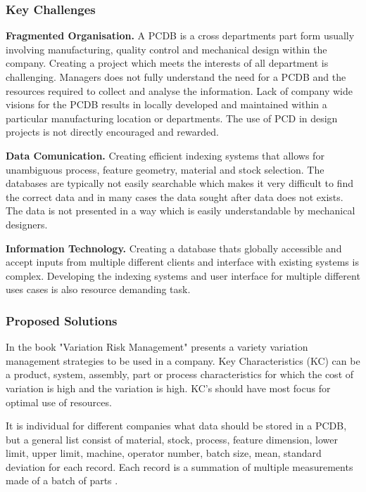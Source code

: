 \documentclass[aip,amsmath, reprint, author-year]{revtex4-1}
\begin{document}
\subsubsection{Key Challenges}
\textbf{Fragmented Organisation.}  A PCDB is a cross departments part form usually involving manufacturing, quality control and mechanical design within the company. 
Creating a project which meets the interests of all department is challenging. 
Managers does not fully understand the need for a PCDB and the resources required to collect and analyse the information. 
Lack of company wide visions for the PCDB results in locally developed and maintained within a particular manufacturing location or departments. 
The use of PCD in design projects is not directly encouraged and rewarded. 

\textbf{Data Comunication.} Creating efficient indexing systems that allows for unambiguous process, feature geometry, material and stock selection. 
The databases are typically not easily searchable which makes it very difficult to find the correct data and in many cases the data sought after data does not exists. 
The data is not presented in a way which is easily understandable by mechanical designers.

\textbf{Information Technology.} Creating a database thats globally accessible and accept inputs from multiple different clients and interface with existing systems is complex.
Developing the indexing systems and user interface for multiple different uses cases is also resource demanding task.  

\subsubsection{Proposed Solutions}
In the book "Variation Risk Management" \cite{thornton2004variation} presents a variety variation management strategies to be used in a company. 
Key Characteristics (KC) can be a product, system, assembly, part or process characteristics for which the cost of variation is high and the variation is high. 
KC's should have most focus for optimal use of resources. 

It is individual for different companies what data should be stored in a PCDB, but a general list consist of material, stock, process, feature dimension, lower limit, upper limit, machine, operator number, batch size, mean, standard deviation for each record. 
Each record is a summation of multiple measurements made of a batch of parts \citep{thornton2004variation}.
\end{document}
